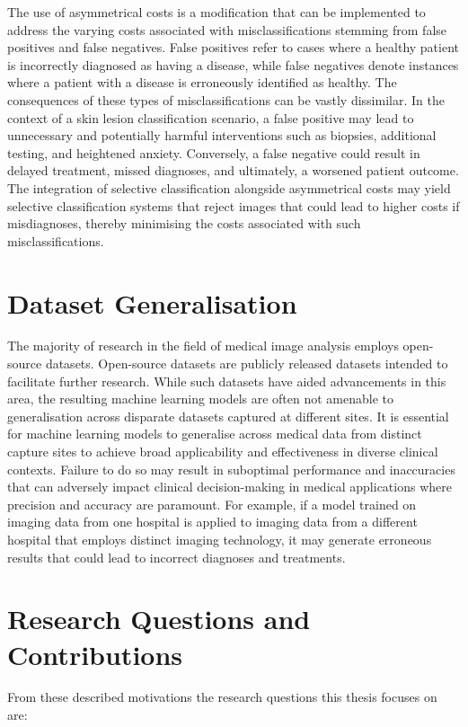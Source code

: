 The use of asymmetrical costs is a modification that can be implemented to address the varying costs associated with misclassifications stemming from false positives and false negatives. False positives refer to cases where a healthy patient is incorrectly diagnosed as having a disease, while false negatives denote instances where a patient with a disease is erroneously identified as healthy. The consequences of these types of misclassifications can be vastly dissimilar. In the context of a skin lesion classification scenario, a false positive may lead to unnecessary and potentially harmful interventions such as biopsies, additional testing, and heightened anxiety. Conversely, a false negative could result in delayed treatment, missed diagnoses, and ultimately, a worsened patient outcome. The integration of selective classification alongside asymmetrical costs may yield selective classification systems that reject images that could lead to higher costs if misdiagnoses, thereby minimising the costs associated with such misclassifications.



\section{Dataset Generalisation}
The majority of research in the field of medical image analysis employs open-source datasets. Open-source datasets are publicly released datasets intended to facilitate further research. While such datasets have aided advancements in this area, the resulting machine learning models are often not amenable to generalisation across disparate datasets captured at different sites. It is essential for machine learning models to generalise across medical data from distinct capture sites to achieve broad applicability and effectiveness in diverse clinical contexts. Failure to do so may result in suboptimal performance and inaccuracies that can adversely impact clinical decision-making in medical applications where precision and accuracy are paramount. For example, if a model trained on imaging data from one hospital is applied to imaging data from a different hospital that employs distinct imaging technology, it may generate erroneous results that could lead to incorrect diagnoses and treatments.



\section{Research Questions and Contributions}
\label{sec:research_contributions}
From these described motivations the research questions this thesis focuses on are:

